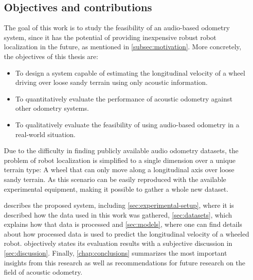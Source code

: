 \subsection{Objectives and contributions} \label{subsec:objectives}

The goal of this work is to study the feasibility of an audio-based odometry
system, since it has the potential of providing inexpensive robust robot
localization in the future, as mentioned in \cref{subsec:motivation}. More
concretely, the objectives of this thesis are:

\begin{itemize}
    \item To design a system capable of estimating the longitudinal velocity of
          a wheel driving over loose sandy terrain using only acoustic information.
          
    \item To quantitatively evaluate the performance of acoustic odometry
          against other odometry systems.
          
    \item To qualitatively evaluate the feasibility of using audio-based
          odometry in a real-world situation.
\end{itemize}

Due to the difficulty in finding publicly available audio odometry datasets,
the problem of robot localization is simplified to a single dimension over a
unique terrain type: A wheel that can only move along a longitudinal axis over
loose sandy terrain. As this scenario can be easily reproduced with the
available experimental equipment, making it possible to gather a whole new
dataset.

 describes the proposed system, including
\cref{sec:experimental-setup}, where it is described how the data used in this
work was gathered, \cref{sec:datasets}, which explains how that data is
processed and \cref{sec:models}, where one can find details about how processed
data is used to predict the longitudinal velocity of a wheeled robot.
 objectively states its evaluation results with a subjective
discussion in \cref{sec:discussion}. Finally, \cref{chap:conclusions}
summarizes the most important insights from this research as well as
recommendations for future research on the field of acoustic odometry.
